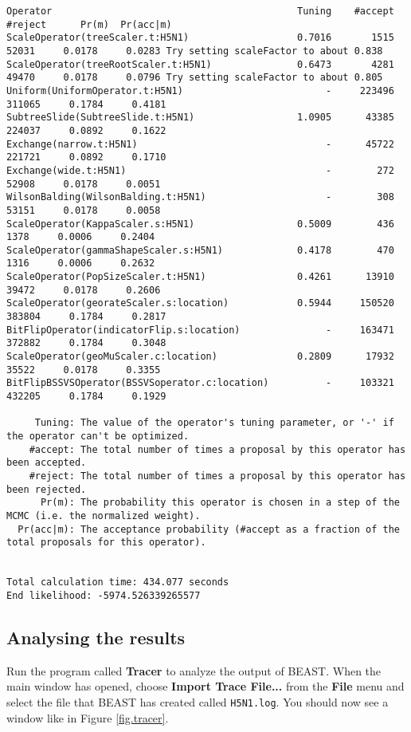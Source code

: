 \documentclass{article}
\begin{document}
{\begin{verbatim}
Operator                                           Tuning    #accept    #reject      Pr(m)  Pr(acc|m)
ScaleOperator(treeScaler.t:H5N1)                   0.7016       1515      52031     0.0178     0.0283 Try setting scaleFactor to about 0.838
ScaleOperator(treeRootScaler.t:H5N1)               0.6473       4281      49470     0.0178     0.0796 Try setting scaleFactor to about 0.805
Uniform(UniformOperator.t:H5N1)                         -     223496     311065     0.1784     0.4181 
SubtreeSlide(SubtreeSlide.t:H5N1)                  1.0905      43385     224037     0.0892     0.1622 
Exchange(narrow.t:H5N1)                                 -      45722     221721     0.0892     0.1710 
Exchange(wide.t:H5N1)                                   -        272      52908     0.0178     0.0051 
WilsonBalding(WilsonBalding.t:H5N1)                     -        308      53151     0.0178     0.0058 
ScaleOperator(KappaScaler.s:H5N1)                  0.5009        436       1378     0.0006     0.2404 
ScaleOperator(gammaShapeScaler.s:H5N1)             0.4178        470       1316     0.0006     0.2632 
ScaleOperator(PopSizeScaler.t:H5N1)                0.4261      13910      39472     0.0178     0.2606 
ScaleOperator(georateScaler.s:location)            0.5944     150520     383804     0.1784     0.2817 
BitFlipOperator(indicatorFlip.s:location)               -     163471     372882     0.1784     0.3048 
ScaleOperator(geoMuScaler.c:location)              0.2809      17932      35522     0.0178     0.3355 
BitFlipBSSVSOperator(BSSVSoperator.c:location)          -     103321     432205     0.1784     0.1929 

     Tuning: The value of the operator's tuning parameter, or '-' if the operator can't be optimized.
    #accept: The total number of times a proposal by this operator has been accepted.
    #reject: The total number of times a proposal by this operator has been rejected.
      Pr(m): The probability this operator is chosen in a step of the MCMC (i.e. the normalized weight).
  Pr(acc|m): The acceptance probability (#accept as a fraction of the total proposals for this operator).


Total calculation time: 434.077 seconds
End likelihood: -5974.526339265577
\end{verbatim}}

\subsection*{Analysing the results}

Run the program called {\bf Tracer} to analyze the output of BEAST. When the main
window has opened, choose {\bf Import Trace File...} from the {\bf File} menu and select the file that
BEAST has created called \texttt{H5N1.log}. 
You should now see a window like in Figure \ref{fig.tracer}.
\end{document}
